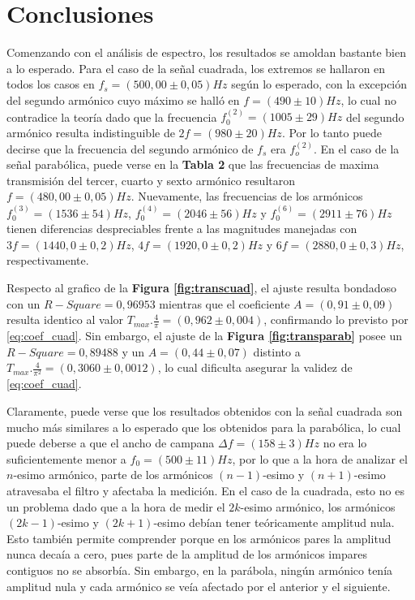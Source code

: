 \documentclass[11pt,a4paper]{article}
\begin{document}
\section{Conclusiones}
\label{sec:conclusiones}

Comenzando con el análisis de espectro, los resultados se amoldan bastante bien a lo esperado. Para el caso de la señal cuadrada, los extremos se hallaron en todos los casos en $f_s = (500,00 \pm 0,05)Hz$ según lo esperado, con la excepción del segundo armónico cuyo máximo se halló en $f = (490 \pm 10)Hz$, lo cual no contradice la teoría dado que la frecuencia $f_0^{(2)} = (1005 \pm 29)Hz$ del segundo armónico resulta indistinguible de $2f = (980 \pm 20)Hz$. Por lo tanto puede decirse que la frecuencia del segundo armónico de $f_s$ era $f_o^{(2)}$. En el caso de la señal parabólica, puede verse en la \textbf{Tabla 2} que las frecuencias de maxima transmisión del tercer, cuarto y sexto armónico resultaron $f = (480,00 \pm 0,05)Hz$. Nuevamente, las frecuencias de los armónicos $f_0^{(3)} = (1536 \pm 54)Hz$, $f_0^{(4)} = (2046 \pm 56)Hz$ y $f_0^{(6)} = (2911 \pm 76)Hz$ tienen diferencias despreciables frente a las magnitudes manejadas con $3f = (1440,0 \pm 0,2)Hz$, $4f = (1920,0 \pm 0,2)Hz$ y $6f = (2880,0 \pm 0,3)Hz$, respectivamente. 

Respecto al grafico de la \textbf{Figura \ref{fig:transcuad}}, el ajuste resulta bondadoso con un $R-Square = 0,96953$ mientras que el coeficiente $A = (0,91 \pm 0,09)$ resulta identico al valor $T_{max}.\frac{4}{\pi} = (0,962 \pm 0,004)$, confirmando lo previsto por \eqref{eq:coef_cuad}. Sin embargo, el ajuste de la \textbf{Figura \ref{fig:transparab}} posee un $R-Square = 0,89488$ y un $A = (0,44 \pm 0,07)$ distinto a $T_{max}.\frac{4}{\pi^2} = (0,3060 \pm 0,0012)$, lo cual dificulta asegurar la validez de \eqref{eq:coef_cuad}. 

Claramente, puede verse que los resultados obtenidos con la señal cuadrada son mucho más similares a lo esperado que los obtenidos para la parabólica, lo cual puede deberse a que el ancho de campana $\Delta f = (158 \pm 3)Hz$ no era lo suficientemente menor a $f_0 = (500 \pm 11)Hz$, por lo que a la hora de analizar el $n$-esimo armónico, parte de los armónicos $(n-1)$-esimo y $(n+1)$-esimo atravesaba el filtro y afectaba la medición. En el caso de la cuadrada, esto no es un problema dado que a la hora de medir el $2k$-esimo armónico, los armónicos $(2k-1)$-esimo y $(2k+1)$-esimo debían tener teóricamente amplitud nula. Esto también permite comprender porque en los armónicos pares la amplitud nunca decaía a cero, pues parte de la amplitud de los armónicos impares contiguos no se absorbía. Sin embargo, en la parábola, ningún armónico tenía amplitud nula y cada armónico se veía afectado por el anterior y el siguiente. 
\end{document}
